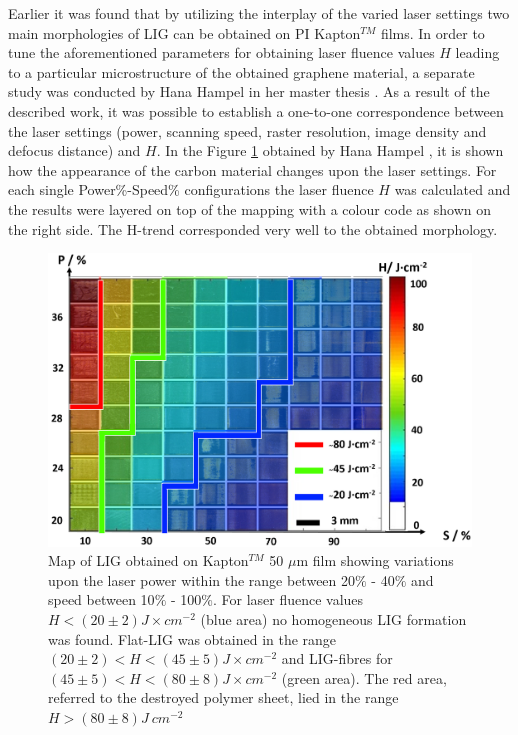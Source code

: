 Earlier \cite{duy_laser-induced_2018} it was found that by utilizing the interplay of the varied laser settings two main morphologies of LIG can be obtained on PI Kapton$^{TM}$ films. In order to tune the aforementioned parameters for obtaining laser fluence values $H$ leading to a particular microstructure of the obtained graphene material, a separate study was conducted by Hana Hampel in her master thesis \cite{hana}. As a result of the described work, it was possible to establish a one-to-one correspondence between the laser settings (power, scanning speed, raster resolution, image density and defocus distance) and $H$. In the Figure \ref{fig:LIG-map} obtained by Hana Hampel \cite{hana}, it is shown how the appearance of the carbon material changes upon the laser settings. For each single Power\%-Speed\% configurations the laser fluence $H$ was calculated and the results were layered on top of the mapping with a colour code as shown on the right side. The H-trend corresponded very well to the obtained morphology. 

\begin{figure}[H]
\centering
\includegraphics[width=1\textwidth]{Figures/ExperimentalSetup/H_mapping_results.PNG}
\medskip
\caption{Map of LIG obtained on Kapton$^{TM}$ 50 $\mu$m film showing variations upon the laser power within the range between 20$\%$ - 40$\%$ and speed between 10$\%$ - 100$\%$. For laser fluence values $H < (20 \pm 2) J \times cm^{-2}$ (blue area) no homogeneous LIG formation was found. Flat-LIG was obtained in the range $(20 \pm 2) < H < (45 \pm 5) J \times cm^{-2}$ and LIG-fibres for $(45 \pm 5) < H < (80 \pm 8) J \times cm^{-2}$ (green area). The red area, referred to the destroyed polymer sheet, lied in the range $H > (80 \pm 8) J \ cm^{-2}$ \cite{hana}}
\label{fig:LIG-map}
\end{figure}

